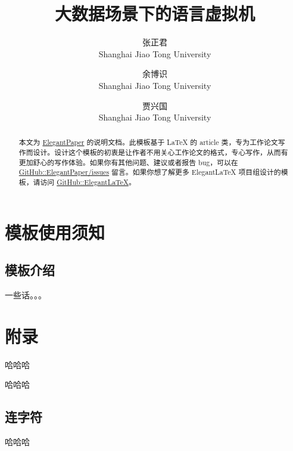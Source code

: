 \documentclass[lang=cn,11pt,a4paper,cite=authoryear]{elegantpaper}
\title{大数据场景下的语言虚拟机}
\author{张正君 \\ Shanghai Jiao Tong University \and 余博识 \\ Shanghai Jiao Tong University \and 贾兴国 \\ Shanghai Jiao Tong University }
\institute{\href{http://www.se.sjtu.edu.cn/}{School of Software Engineering}}
\date{\zhtoday}
\begin{document}
\maketitle

\begin{abstract}
本文为 \href{https://github.com/ElegantLaTeX/ElegantPaper/}{ElegantPaper} 的说明文档。此模板基于 \LaTeX{} 的 article 类，专为工作论文写作而设计。设计这个模板的初衷是让作者不用关心工作论文的格式，专心写作，从而有更加舒心的写作体验。如果你有其他问题、建议或者报告 bug，可以在 \href{https://github.com/ElegantLaTeX/ElegantPaper/issues}{GitHub::ElegantPaper/issues} 留言。如果你想了解更多 Elegant\LaTeX{} 项目组设计的模板，请访问 \href{https://github.com/ElegantLaTeX/}{GitHub::ElegantLaTeX}。
\end{abstract}



\section{模板使用须知}

\subsection{模板介绍}

一些话。。。

\nocite{*}


\appendix
\addappheadtotoc
\section{附录}
哈哈哈

哈哈哈
\subsection{连字符}

哈哈哈
\end{document}
